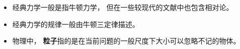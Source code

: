 
\begin{issues}
\issueDraft
\end{issues}

\begin{itemize}
\item 经典力学一般是指牛顿力学， 但在一些较现代的文献中也包含相对论。
\item 经典力学的规律一般由牛顿三定律描述。
\item 物理中， \textbf{粒子}指的是在当前问题的一般尺度下大小可以忽略不记的物体。
\end{itemize}
